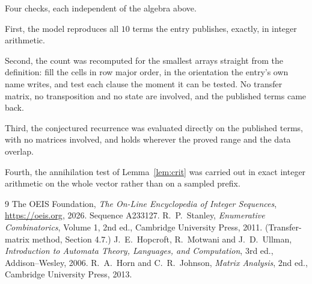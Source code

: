 \documentclass[11pt,a4paper]{article}
\theoremstyle{plain}
\theoremstyle{definition}
\begin{document}
Four checks, each independent of the algebra above.

First, the model reproduces all $10$ terms the entry publishes, exactly, in integer
arithmetic.

Second, the count was recomputed for the smallest arrays straight from the definition: fill the
cells in row major order, in the orientation the entry's own name writes, and test each clause
the moment it can be tested. No transfer matrix, no transposition and no state are involved,
and the published terms came back.

Third, the conjectured recurrence was evaluated directly on the published terms, with no
matrices involved, and holds wherever the proved range and the data overlap.

Fourth, the annihilation test of Lemma~\ref{lem:crit} was carried out in exact integer
arithmetic on the whole vector rather than on a sampled prefix.

\begin{thebibliography}{9}
 The OEIS Foundation, \emph{The On-Line Encyclopedia of Integer
Sequences}, \url{https://oeis.org}, 2026. Sequence A233127.
 R.~P.~Stanley, \emph{Enumerative Combinatorics}, Volume 1, 2nd ed.,
Cambridge University Press, 2011. (Transfer-matrix method, Section 4.7.)
 J.~E.~Hopcroft, R.~Motwani and J.~D.~Ullman, \emph{Introduction to Automata
Theory, Languages, and Computation}, 3rd ed., Addison--Wesley, 2006.
 R.~A.~Horn and C.~R.~Johnson, \emph{Matrix Analysis}, 2nd ed., Cambridge
University Press, 2013.
\end{thebibliography}
\end{document}
